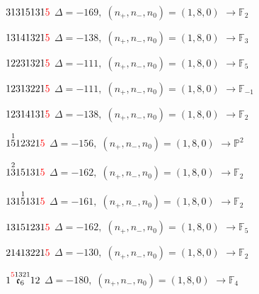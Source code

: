 \documentclass[10pt]{article}
\begin{document}
$31315131\textcolor{red}{5}$ \quad $\Delta=-169,\; (n_+,n_-,n_0)=(1,8,0)$ \quad $\to \mathbb{F}_{2}$

\smallskip

$13141321\textcolor{red}{5}$ \quad $\Delta=-138,\; (n_+,n_-,n_0)=(1,8,0)$ \quad $\to \mathbb{F}_{3}$

\smallskip

$12231321\textcolor{red}{5}$ \quad $\Delta=-111,\; (n_+,n_-,n_0)=(1,8,0)$ \quad $\to \mathbb{F}_{5}$

$12313221\textcolor{red}{5}$ \quad $\Delta=-111,\; (n_+,n_-,n_0)=(1,8,0)$ \quad $\to \mathbb{F}_{-1}$

\smallskip

$12314131\textcolor{red}{5}$ \quad $\Delta=-138,\; (n_+,n_-,n_0)=(1,8,0)$ \quad $\to \mathbb{F}_{2}$

\smallskip

$1\overset{1}{5}12321\textcolor{red}{5}$ \quad $\Delta=-156,\; (n_+,n_-,n_0)=(1,8,0)$ \quad $\to \mathbb{P}^2$

\smallskip

$1\overset{2}{3}15131\textcolor{red}{5}$ \quad $\Delta=-162,\; (n_+,n_-,n_0)=(1,8,0)$ \quad $\to \mathbb{F}_{2}$

\smallskip

$131\overset{1}{5}131\textcolor{red}{5}$ \quad $\Delta=-161,\; (n_+,n_-,n_0)=(1,8,0)$ \quad $\to \mathbb{F}_{2}$

\smallskip

$13151231\textcolor{red}{5}$ \quad $\Delta=-162,\; (n_+,n_-,n_0)=(1,8,0)$ \quad $\to \mathbb{F}_{5}$

\smallskip

$21413221\textcolor{red}{5}$ \quad $\Delta=-130,\; (n_+,n_-,n_0)=(1,8,0)$ \quad $\to \mathbb{F}_{2}$

\smallskip

$1\overset{\textcolor{red}{5}1321}{\mathfrak{e}_6}12$ \quad $\Delta=-180,\; (n_+,n_-,n_0)=(1,8,0)$ \quad $\to \mathbb{F}_{4}$

\smallskip
\end{document}
